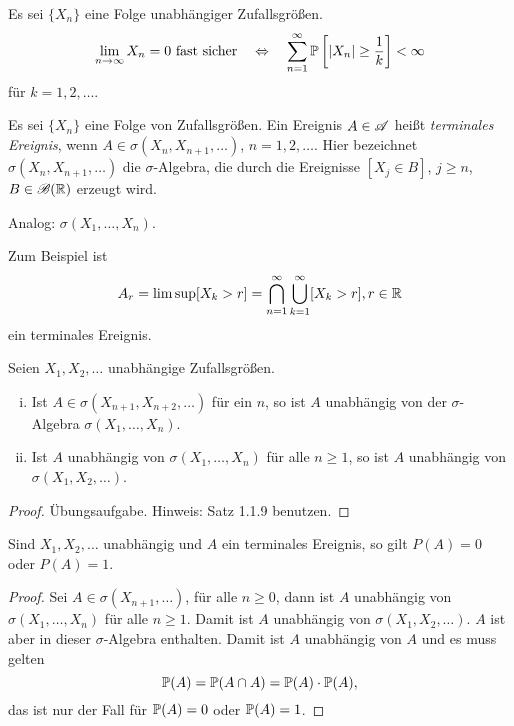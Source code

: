 \clearpage

\begin{thm}
  Es sei $\{X_n\}$ eine Folge unabhängiger Zufallsgrößen.
  \[ \lim_{n \to \infty} X_n = 0 \text{ fast sicher} \quad \Leftrightarrow \quad \sum_{n=1}^\infty
    \mathbb{P}\left[ |X_n| \ge \frac{1}{k} \right] < \infty \]
  für $k = 1, 2, \ldots$.
\end{thm}

\begin{defn}
  Es sei $\{ X_n \}$ eine Folge von Zufallsgrößen. Ein Ereignis $A \in \mathscr{A}$
  heißt \emph{terminales Ereignis}, wenn $A \in \sigma( X_n, X_{n+1}, \ldots)$,
  $n=1,2,\ldots$. Hier bezeichnet $\sigma(X_n, X_{n+1}, \ldots)$ die
  $\sigma$-Algebra, die durch die Ereignisse $[X_j \in B]$, $j \ge n$, $B \in
  \mathscr{B}(\mathbb{R})$ erzeugt wird.

  Analog: $\sigma(X_1, \ldots, X_n)$.

  Zum Beispiel ist
  \[ A_r = \limsup [X_k > r] = \bigcap_{n=1}^\infty \bigcup_{k=1}^\infty
    [X_k > r], r \in \mathbb{R} \]
  ein terminales Ereignis.
\end{defn}

\begin{lem}
  Seien $X_1, X_2, \ldots$ unabhängige Zufallsgrößen.
  \begin{enumerate}[(i)]
  \item Ist $A \in \sigma( X_{n+1}, X_{n+2}, \ldots )$ für ein $n$, so ist $A$
    unabhängig von der $\sigma$-Algebra $\sigma(X_1, \ldots, X_n)$.
  \item Ist $A$ unabhängig von $\sigma( X_1, \ldots, X_n)$ für alle $n \ge 1$,
    so ist $A$ unabhängig von $\sigma( X_1, X_2, \ldots )$.
  \end{enumerate}
\end{lem}

\begin{proof}
  Übungsaufgabe. Hinweis: Satz 1.1.9 benutzen.
\end{proof}

\begin{thm}
  Sind $X_1, X_2, \ldots$ unabhängig und $A$ ein terminales Ereignis, so gilt
  $P(A) = 0$ oder $P(A) = 1$.
\end{thm}

\begin{proof}
  Sei $A \in \sigma(X_{n+1}, \ldots)$, für alle $n \ge 0$, dann ist $A$
  unabhängig von $\sigma(X_1, \ldots, X_n)$ für alle $n \ge 1$. Damit ist $A$
  unabhängig von $\sigma( X_1, X_2, \ldots)$. $A$ ist aber in dieser
  $\sigma$-Algebra enthalten. Damit ist $A$ unabhängig von $A$ und es muss
  gelten
  \[ \mathbb{P}(A) = \mathbb{P}(A \cap A) = \mathbb{P}(A) \cdot \mathbb{P}(A), \]
  das ist nur der Fall für $\mathbb{P}(A) = 0$ oder $\mathbb{P}(A) = 1$.
\end{proof}

